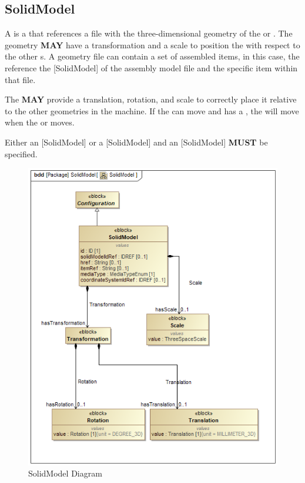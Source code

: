 \subsection{SolidModel} \label{sec:SolidModel}


A  is a  that references a file with the three-dimensional geometry of the  or . The geometry \textbf{MAY} have a transformation and a scale to position the  with respect to the other s. A geometry file can contain a set of assembled items, in this case, the  reference the [SolidModel] of the assembly model file and the specific item within that file.

The  \textbf{MAY} provide a translation, rotation, and scale to correctly place it relative to the other geometries in the machine. If the  can move and has a  , the  will move when the  or  moves.

Either an [SolidModel] or a [SolidModel] and an [SolidModel] \textbf{MUST} be specified.

\begin{figure}[ht]
  \centering
    \includegraphics[width=1.0\textwidth]{figures/SolidModel.png}
  \caption{SolidModel Diagram}
  \label{fig:SolidModel Diagram}
\end{figure}

